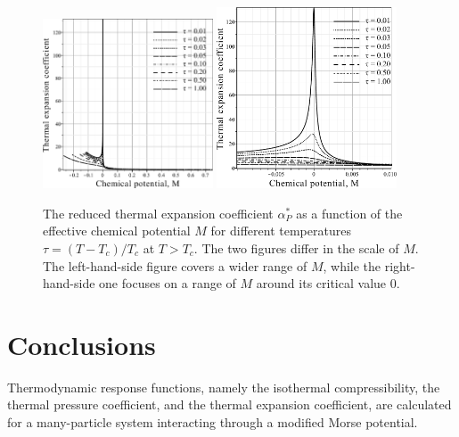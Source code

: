 \documentclass[12pt]{article}
\begin{document}
	\begin{figure}[h!]
		\centering \includegraphics[width=0.45\textwidth]{f4b.pdf}
		\includegraphics[width=0.475\textwidth]{f4c.pdf}
		\vskip-3mm\caption{The reduced thermal expansion coefficient $\alpha^*_P$ as a function of the effective chemical potential $M$ for different temperatures $\tau = (T - T_c)/T_c$ at $T > T_c$. The two figures differ in the scale of $M$. The left-hand-side figure covers a wider range of $M$, while the right-hand-side one focuses on a range of $M$ around its critical value $0$.
		}\label{fig4b}
	\end{figure}
	
	\newpage 
	
	\section{Conclusions}
	Thermodynamic response functions, namely the isothermal compressibility, the thermal pressure coefficient, and the thermal expansion coefficient, are calculated for a many-particle system interacting through a modified Morse potential.
	
	
	
	
\end{document}
